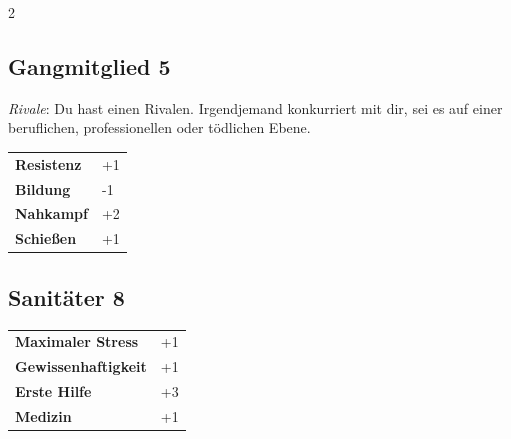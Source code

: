 \begin{multicols}{2}
\begin{tcolorbox}

\end{tcolorbox}

\begin{tcolorbox}
    \subsection*{Gangmitglied \hfill \small{5 }}
    \tcblower
\textit{Rivale}: Du hast einen Rivalen. Irgendjemand konkurriert mit dir, sei es auf einer beruflichen, professionellen oder tödlichen Ebene.


\vspace{3mm}

\begin{tabular}{@{}ll@{}}
    \textbf{Resistenz} & +1\\
    \textbf{Bildung} & -1\\
    \textbf{Nahkampf} & +2\\
    \textbf{Schießen} & +1\\
\end{tabular}


\end{tcolorbox}

\begin{tcolorbox}
    \subsection*{Sanitäter \hfill \small{8 }}
    \tcblower




\begin{tabular}{@{}ll@{}}
    \textbf{Maximaler Stress} & +1\\
    \textbf{Gewissenhaftigkeit} & +1\\
    \textbf{Erste Hilfe} & +3\\
    \textbf{Medizin} & +1\\
\end{tabular}


\end{tcolorbox}
\end{multicols}
